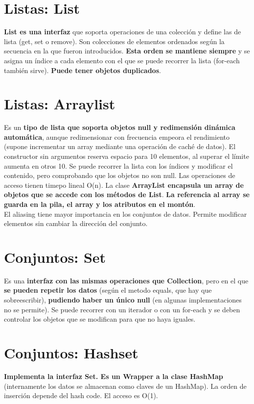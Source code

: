 \documentclass{article}
\begin{document}
\section{Listas: List}
\textbf{List es una interfaz} que soporta operaciones de una colección y define las de lista (get, set o remove). Son colecciones de elementos ordenados según la secuencia en la que fueron introducidos. \textbf{Esta orden se mantiene siempre} y se asigna un índice a cada elemento con el que se puede recorrer la lista (for-each también sirve). \textbf{Puede tener objetos duplicados}. 

\newpage

\section{Listas: Arraylist}
Es un \textbf{tipo de lista que soporta objetos null y redimensión dinámica automática}, aunque redimensionar con frecuencia empeora el rendimiento (supone incrementar un array mediante una operación de caché de datos). El constructor sin argumentos reserva espacio para 10 elementos, al superar el límite aumenta en otros 10. Se puede recorrer la lista con los índices y modificar el contenido, pero comprobando que los objetos no son null. Las operaciones de acceso tienen timepo lineal O(n). La clase \textbf{ArrayList encapsula un array de objetos que se accede con los métodos de List}. \textbf{La referencia al array se guarda en la pila, el array y los atributos en el montón}. \\
El aliasing tiene mayor importancia en los conjuntos de datos. Permite modificar elementos sin cambiar la dirección del conjunto.

\section{Conjuntos: Set}
Es una \textbf{interfaz con las mismas operaciones que Collection}, pero en el que \textbf{se pueden repetir los datos} (según el metodo equals, que hay que sobreescribir), \textbf{pudiendo haber un único null} (en algunas implementaciones no se permite). Se puede recorrer con un iterador o con un for-each y se deben controlar los objetos que se modifican para que no haya iguales.

\section{Conjuntos: Hashset}
\textbf{Implementa la interfaz Set. Es un Wrapper a la clase HashMap} (internamente los datos se almacenan como claves de un HashMap). La orden de inserción depende del hash code. El acceso es O(1).
\end{document}
